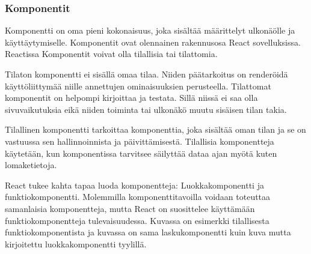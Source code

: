 \subsubsection{Komponentit}











Komponentti on oma pieni kokonaisuus, joka sisältää määrittelyt ulkonäölle ja käyttäytymiselle.
Komponentit ovat olennainen rakennusosa React sovelluksissa.
Reactissa Komponentit voivat olla tilallisia tai tilattomia. 
\medskip



Tilaton komponentti ei sisällä omaa tilaa. 
Niiden päätarkoitus on renderöidä käyttöliittymää niille annettujen ominaisuuksien perusteella.
Tilattomat komponentit on helpompi kirjoittaa ja testata. 
Sillä niissä ei saa olla sivuvaikutuksia eikä niiden toiminta tai ulkonäkö muutu sisäisen tilan takia.
\medskip


Tilallinen komponentti tarkoittaa komponenttia, 
joka sisältää oman tilan ja se on vastuussa sen hallinnoinnista ja päivittämisestä.
Tilallisia komponentteja käytetään, kun komponentissa tarvitsee säilyttää dataa ajan myötä 
kuten lomaketietoja.\\
\medskip







React tukee kahta tapaa luoda komponentteja: Luokkakomponentti ja funktiokomponentti.
Molemmilla komponenttitavoilla voidaan toteuttaa samanlaisia komponentteja, mutta React on suosittelee käyttämään funktiokomponentteja tulevaisuudessa. 
Kuvassa \nextImageCount {} on esimerkki tilallisesta funktiokomponentista ja
kuvassa \nextnextImageCount {} on sama laskukomponentti kuin kuva \nextImageCount{} mutta kirjoitettu luokkakomponentti tyylillä. 
\medskip


